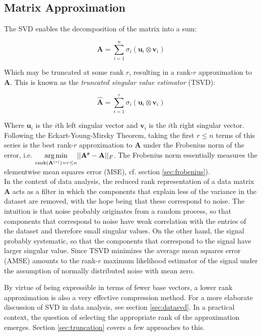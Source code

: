 \subsection{Matrix Approximation}
The SVD enables the decomposition of the matrix into a sum:

\begin{equation}
\mathbf{A} = \sum_{i=1}^n \sigma_i (\mathbf{u}_i \otimes \mathbf{v}_i)
\end{equation}

Which may be truncated at some rank $r$, resulting in a rank-$r$ approximation to $\mathbf{A}$. This is known as the \textit{truncated singular value estimator} (TSVD):

\begin{equation}
\mathbf{\hat{A}} = \sum_{i=1}^r \sigma_i (\mathbf{u}_i \otimes \mathbf{v}_i)
\end{equation}

Where $\mathbf{u}_i$ is the $i$th left singular vector and $\mathbf{v}_i$ is the $i$th right singular vector. Following the Eckart-Young-Mirsky Theorem, taking the first $r \leq n$ terms of this series is the best rank-$r$ approximation to $\mathbf{A}$ under the Frobenius norm of the error, i.e.  $\underset{\mathrm{rank}(\mathbf{A}^{(r)})=r\leq n}{\operatorname*{arg\,min}} ||\mathbf{A^r}-\mathbf{A}||_F$. The Frobenius norm essentially measures the elementwise mean squares error (MSE), cf. section \ref{sec:frobenius}).\\

In the context of data analysis, the reduced rank representation of a data matrix $\mathbf{A}$ acts as a filter in which the components that explain less of the variance in the dataset are removed, with the hope being that these correspond to noise. The intuition is that noise probably originates from a random process, so that components that correspond to noise have weak correlation with the entries of the dataset and therefore small singular values. On the other hand, the signal probably systematic, so that the components that correspond to the signal have larger singular value. Since TSVD minimizes the average mean squares error (AMSE) amounts to the rank-$r$ maximum likelihood estimator of the signal under the assumption of normally distributed noise with mean zero. 

By virtue of being expressible in terms of fewer base vectors, a lower rank approximation is also a very effective compression method. For a more elaborate discussion of SVD in data analysis, see section \ref{sec:datasvd}. In a practical context, the question of selecting the appropriate rank of the approximation emerges. Section \ref{sec:truncation} covers a few approaches to this.


